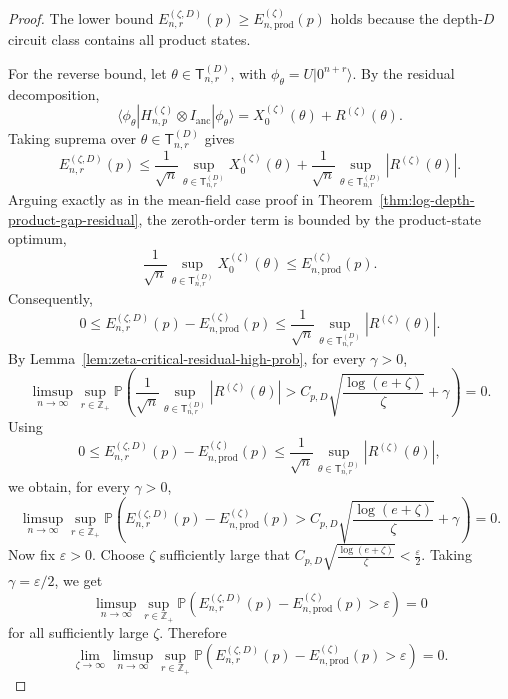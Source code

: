 \documentclass[12pt]{article}
\renewcommand{\P}{\mathbb{P}}
\begin{document}
\begin{proof}
The lower bound $E_{n,r}^{(\zeta,D)}(p) \ge E_{n,\mathrm{prod}}^{(\zeta)}(p)$ holds because the depth-\(D\) circuit class contains all product states.

For the reverse bound, let \(\theta\in\mathsf{T}_{n,r}^{(D)}\), with
\(\phi_\theta=U|0^{n+r}\rangle\). By the residual decomposition,
\[
\langle\phi_\theta|H_{n,p}^{(\zeta)} \otimes I_{\mathrm{anc}}|\phi_\theta\rangle
=
X_0^{(\zeta)}(\theta)
+
R^{(\zeta)}(\theta).
\]
Taking suprema over \(\theta\in\mathsf{T}_{n,r}^{(D)}\) gives
\[
E_{n,r}^{(\zeta,D)}(p)
\le
\frac1{\sqrt n}
\sup_{\theta\in\mathsf{T}_{n,r}^{(D)}}X_0^{(\zeta)}(\theta)
+
\frac1{\sqrt n}
\sup_{\theta\in\mathsf{T}_{n,r}^{(D)}}|R^{(\zeta)}(\theta)|.
\]
Arguing exactly as in the mean-field case proof in Theorem~\ref{thm:log-depth-product-gap-residual}, the zeroth-order term is bounded by the product-state optimum, 
\[
\frac1{\sqrt n}
\sup_{\theta\in\mathsf{T}_{n,r}^{(D)}}X_0^{(\zeta)}(\theta)
\le
E_{n,\mathrm{prod}}^{(\zeta)}(p).
\]
Consequently,
\[
0\le
E_{n,r}^{(\zeta,D)}(p)
-
E_{n,\mathrm{prod}}^{(\zeta)}(p)
\le
\frac1{\sqrt n}
\sup_{\theta\in\mathsf{T}_{n,r}^{(D)}}|R^{(\zeta)}(\theta)|.
\]
By Lemma~\ref{lem:zeta-critical-residual-high-prob}, for every \(\gamma>0\),
\[
\limsup_{n\to\infty}
\sup_{r\in\mathbb Z_+}
\P\left(
\frac1{\sqrt n}
\sup_{\theta\in\mathsf T_{n,r}^{(D)}}
|R^{(\zeta)}(\theta)|
>
C_{p,D}\sqrt{\frac{\log(e+\zeta)}{\zeta}}
+\gamma
\right)
=0.
\]
Using
\[
0\le
E_{n,r}^{(\zeta,D)}(p)
-
E_{n,\mathrm{prod}}^{(\zeta)}(p)
\le
\frac1{\sqrt n}
\sup_{\theta\in\mathsf T_{n,r}^{(D)}}
|R^{(\zeta)}(\theta)|,
\]
we obtain, for every \(\gamma>0\),
\[
\limsup_{n\to\infty}
\sup_{r\in\mathbb Z_+}
\P\left(
E_{n,r}^{(\zeta,D)}(p)
-
E_{n,\mathrm{prod}}^{(\zeta)}(p)
>
C_{p,D}\sqrt{\frac{\log(e+\zeta)}{\zeta}}
+\gamma
\right)
=0.
\]
Now fix \(\varepsilon>0\). Choose \(\zeta\) sufficiently large that $C_{p,D}\sqrt{\frac{\log(e+\zeta)}{\zeta}}
< \frac{\varepsilon}{2}$.
Taking \(\gamma=\varepsilon/2\), we get
\[
\limsup_{n\to\infty}
\sup_{r\in\mathbb Z_+}
\P\left(
E_{n,r}^{(\zeta,D)}(p)
-
E_{n,\mathrm{prod}}^{(\zeta)}(p)
>
\varepsilon
\right)
=0
\]
for all sufficiently large \(\zeta\). Therefore
\[
\lim_{\zeta\to\infty}
\limsup_{n\to\infty}
\sup_{r\in\mathbb Z_+}
\P\left(
E_{n,r}^{(\zeta,D)}(p)
-
E_{n,\mathrm{prod}}^{(\zeta)}(p)
>
\varepsilon
\right)
=0.
\]
\end{proof}
\end{document}
